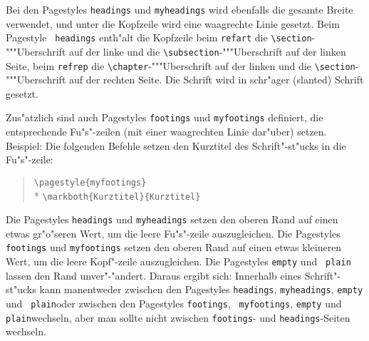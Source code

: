Bei den Pagestyles {\tt headings} und {\tt myheadings} wird 
ebenfalls die gesamte Breite verwendet, und unter die Kopfzeile 
wird eine waagrechte Linie gesetzt. Beim Pagestyle {\tt 
headings} enth"alt die Kopfzeile beim {\tt refart} die 
\verb|\section|-"""Uberschrift auf der linke und die 
\verb|\subsection|-"""Uberschrift auf der linken Seite, beim 
{\tt refrep} die \verb|\chapter|-"""Uberschrift auf der linken 
und die \verb|\section|-"""Uberschrift auf der rechten Seite. 
Die Schrift wird in schr"ager (slanted) Schrift gesetzt.


Zus"atzlich sind auch Pagestyles {\tt footings} und {\tt myfootings} 
definiert, die entsprechende Fu"s"-zeilen (mit einer waagrechten Linie 
dar"uber) setzen. Beispiel: Die folgenden Befehle setzen den Kurztitel des 
Schrift"-st"ucks in die Fu"s"-zeile:
\begin{verse}
\verb|\pagestyle{myfootings}| \\*
\verb|\markboth{Kurztitel}{Kurztitel}|
\end{verse}

Die Pagestyles {\tt headings} und {\tt myheadings} setzen den oberen 
Rand auf einen etwas gr"o"seren Wert, um die leere Fu"s"-zeile 
auszugleichen. Die Pagestyles {\tt footings} und {\tt myfootings} 
setzen den oberen Rand auf einen etwas kleineren Wert, um die 
leere Kopf"-zeile auszugleichen. Die Pagestyles {\tt empty} und {\tt 
plain} lassen den Rand unver"-"andert. Daraus ergibt sich: Innerhalb 
eines Schrift"-st"ucks kann man\newline entweder zwischen den 
Pagestyles {\tt headings}, {\tt myheadings}, {\tt empty} und {\tt 
plain}\newline oder zwischen den Pagestyles {\tt footings}, {\tt 
myfootings}, {\tt empty} und {\tt plain}\newline wechseln, aber man 
sollte nicht zwischen {\tt footings}- und {\tt headings}-Seiten 
wechseln.


